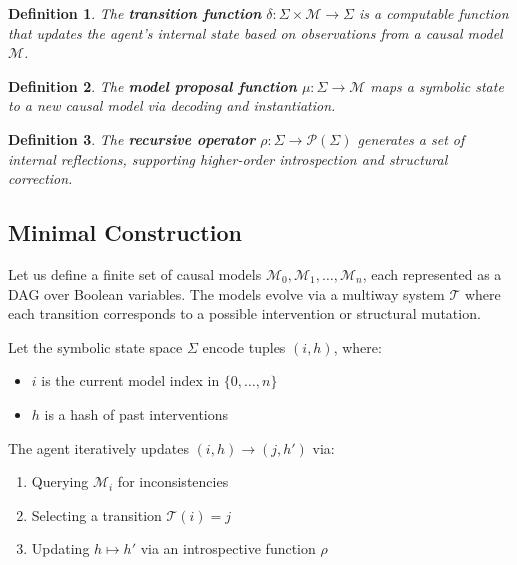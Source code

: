 \documentclass[10pt]{article}
\newtheorem{definition}{Definition}
\begin{document}
\begin{definition}

The \textbf{transition function} \( \delta: \Sigma \times \mathcal{M}
\rightarrow \Sigma \) is a computable function that updates the agent's
internal state based on observations from a causal model \( \mathcal{M} \).

\end{definition}

\begin{definition}

The \textbf{model proposal function} \( \mu: \Sigma \rightarrow \mathcal{M} \)
maps a symbolic state to a new causal model via decoding and instantiation.

\end{definition}

\begin{definition}

The \textbf{recursive operator} \( \rho: \Sigma \rightarrow \mathcal{P}(\Sigma)
\) generates a set of internal reflections, supporting higher-order
introspection and structural correction.

\end{definition}

\subsection{Minimal Construction}

Let us define a finite set of causal models \( \mathcal{M}_0, \mathcal{M}_1,
\dots, \mathcal{M}_n \), each represented as a DAG over Boolean variables. The
models evolve via a multiway system \( \mathcal{T} \) where each transition
corresponds to a possible intervention or structural mutation.

Let the symbolic state space \( \Sigma \) encode tuples \( (i, h) \), where:
\begin{itemize}
    \item \( i \) is the current model index in \( \{0, \dots, n\} \)
    \item \( h \) is a hash of past interventions
\end{itemize}

The agent iteratively updates \( (i, h) \rightarrow (j, h') \) via:
\begin{enumerate}
    \item Querying \( \mathcal{M}_i \) for inconsistencies
    \item Selecting a transition \( \mathcal{T}(i) = j \)
    \item Updating \( h \mapsto h' \) via an introspective function \( \rho \)
\end{enumerate}
\end{document}
